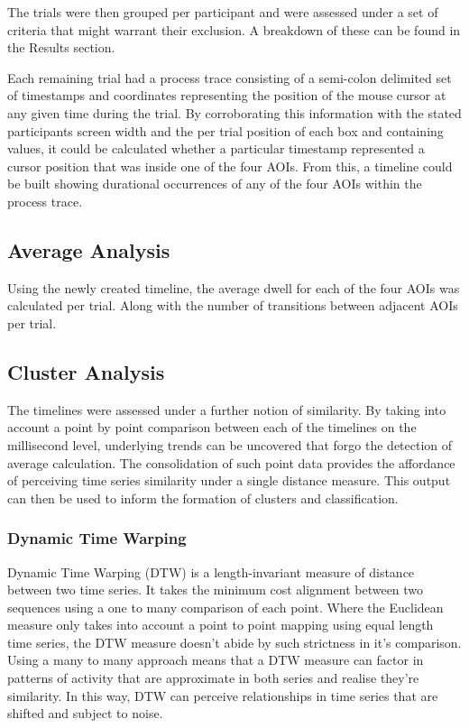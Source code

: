 \documentclass[man, floatsintext]{apa7}
\begin{document}
The trials were then grouped per participant and were assessed under a set of criteria that might warrant their exclusion. A breakdown of these can be found in the Results section.

Each remaining trial had a process trace consisting of a semi-colon delimited set of timestamps and coordinates representing the position of the mouse cursor at any given time during the trial.  By corroborating this information with the stated participants screen width and the per trial position of each box and containing values, it could be calculated whether a particular timestamp represented a cursor position that was inside one of the four AOIs. From this, a timeline could be built showing durational occurrences of any of the four AOIs within the process trace.

\subsection{Average Analysis}

Using the newly created timeline, the average dwell for each of the four AOIs was calculated per trial. Along with the number of transitions between adjacent AOIs per trial. 

\subsection{Cluster Analysis}

The timelines were assessed under a further notion of similarity. By taking into account a point by point comparison between each of the timelines on the millisecond level, underlying trends can be uncovered that forgo the detection of average calculation. The consolidation of such point data provides the affordance of perceiving time series similarity under a single distance measure. This output can then be used to inform the formation of clusters and classification.

\subsubsection{Dynamic Time Warping}

Dynamic Time Warping (DTW) is a length-invariant measure of distance between two time series. It takes the minimum cost alignment between two sequences using a one to many comparison of each point. Where the Euclidean measure only takes into account a point to point mapping using equal length time series, the DTW measure doesn't abide by such strictness in it's comparison. Using a many to many approach means that a DTW measure can factor in patterns of activity that are approximate in both series and realise they're similarity. In this way, DTW can perceive relationships in time series that are shifted and subject to noise.
\end{document}
